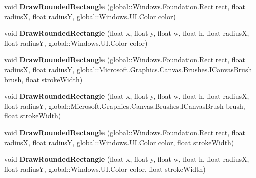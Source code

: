 \begin{DoxyCompactItemize}
void {\bfseries Draw\+Rounded\+Rectangle} (global\+::\+Windows.\+Foundation.\+Rect rect, float radiusX, float radiusY, global\+::\+Windows.\+U\+I.\+Color color)
\item 
\mbox{\label{interface_microsoft_1_1_graphics_1_1_canvas_1_1_i_canvas_drawing_session_a8aafbc2f552134498d59d2eb75342ef0}} 
void {\bfseries Draw\+Rounded\+Rectangle} (float x, float y, float w, float h, float radiusX, float radiusY, global\+::\+Windows.\+U\+I.\+Color color)
\item 
\mbox{\label{interface_microsoft_1_1_graphics_1_1_canvas_1_1_i_canvas_drawing_session_ab24f3eef9aea1a4a6eb20752d4bca24f}} 
void {\bfseries Draw\+Rounded\+Rectangle} (global\+::\+Windows.\+Foundation.\+Rect rect, float radiusX, float radiusY, global\+::\+Microsoft.\+Graphics.\+Canvas.\+Brushes.\+I\+Canvas\+Brush brush, float stroke\+Width)
\item 
\mbox{\label{interface_microsoft_1_1_graphics_1_1_canvas_1_1_i_canvas_drawing_session_abca20a3d8cdd540a5b30f61043335a5f}} 
void {\bfseries Draw\+Rounded\+Rectangle} (float x, float y, float w, float h, float radiusX, float radiusY, global\+::\+Microsoft.\+Graphics.\+Canvas.\+Brushes.\+I\+Canvas\+Brush brush, float stroke\+Width)
\item 
\mbox{\label{interface_microsoft_1_1_graphics_1_1_canvas_1_1_i_canvas_drawing_session_aed38b7f6c741ca5c56a83f9581d81dca}} 
void {\bfseries Draw\+Rounded\+Rectangle} (global\+::\+Windows.\+Foundation.\+Rect rect, float radiusX, float radiusY, global\+::\+Windows.\+U\+I.\+Color color, float stroke\+Width)
\item 
\mbox{\label{interface_microsoft_1_1_graphics_1_1_canvas_1_1_i_canvas_drawing_session_ae90fe213640a24a7f37e6b74de2ee531}} 
void {\bfseries Draw\+Rounded\+Rectangle} (float x, float y, float w, float h, float radiusX, float radiusY, global\+::\+Windows.\+U\+I.\+Color color, float stroke\+Width)
\item 
\mbox{\label{interface_microsoft_1_1_graphics_1_1_canvas_1_1_i_canvas_drawing_session_a4452172bd34570eda5770c3162df0150}} 

\end{DoxyCompactItemize}
